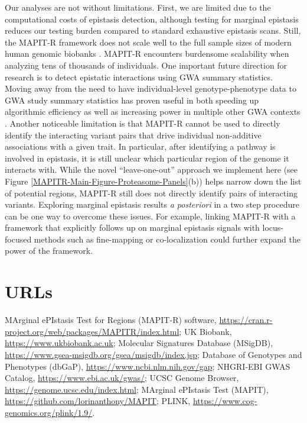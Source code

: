 \documentclass[10pt]{article}
\begin{document}
Our analyses are not without limitations. First, we are limited due to the computational costs of epistasis detection, although testing for marginal epistasis reduces our testing burden compared to standard exhaustive epistasis scans. Still, the MAPIT-R framework does not scale well to the full sample sizes of modern human genomic biobanks \cite{Crawford2017a,Crawford2018a,Moore2019}. MAPIT-R encounters burdensome scalability when analyzing tens of thousands of individuals. One important future direction for research is to detect epistatic interactions using GWA summary statistics. Moving away from the need to have individual-level genotype-phenotype data to GWA study summary statistics has proven useful in both speeding up algorithmic efficiency as well as increasing power in multiple other GWA contexts \cite{Shi2016,Johnson2018,Ray2018,Turchin2019,Urbut2019,Cheng2020}. Another noticeable limitation is that MAPIT-R cannot be used to directly identify the interacting variant pairs that drive individual non-additive associations with a given trait. In particular, after identifying a pathway is involved in epistasis, it is still unclear which particular region of the genome it interacts with. While the novel ``leave-one-out'' approach we implement here (see Figure \ref{MAPITR-Main-Figure-Proteasome-Panels}(b)) helps narrow down the list of potential regions, MAPIT-R still does not directly identify pairs of interacting variants. Exploring marginal epistasis results \textit{a posteriori} in a two step procedure can be one way to overcome these issues. For example, linking MAPIT-R with a framework that explicitly follows up on marginal epistasis signals with locus-focused methods such as fine-mapping \cite{Kichaev2014,Chen2015,Benner2016} or co-localization \cite{Hormozdiari2016,Zhu2016,Wen2017,Giambartolomei2018,Wallace2020} could further expand the power of the framework. 


\section*{URLs}\label{MAPITR-URLs}

MArginal ePIstasis Test for Regions (MAPIT-R) software, \url{https://cran.r-project.org/web/packages/MAPITR/index.html}; UK Biobank, \url{https://www.ukbiobank.ac.uk}; Molecular Signatures Database (MSigDB), \url{https://www.gsea-msigdb.org/gsea/msigdb/index.jsp}; Database of Genotypes and Phenotypes (dbGaP), \url{https://www.ncbi.nlm.nih.gov/gap}; NHGRI-EBI GWAS Catalog, \url{https://www.ebi.ac.uk/gwas/}; UCSC Genome Browser, \url{https://genome.ucsc.edu/index.html}; MArginal ePIstasis Test (MAPIT), \url{https://github.com/lorinanthony/MAPIT}; PLINK, \url{https://www.cog-genomics.org/plink/1.9/}.
\end{document}
